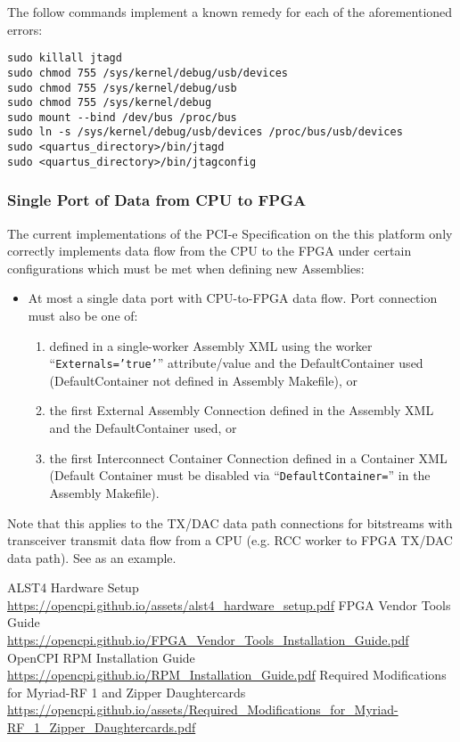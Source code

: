 \documentclass{article}
\begin{document}
\noindent The follow commands implement a known remedy for each of the aforementioned errors:
\begin{lstlisting}
sudo killall jtagd
sudo chmod 755 /sys/kernel/debug/usb/devices
sudo chmod 755 /sys/kernel/debug/usb
sudo chmod 755 /sys/kernel/debug
sudo mount --bind /dev/bus /proc/bus
sudo ln -s /sys/kernel/debug/usb/devices /proc/bus/usb/devices
sudo <quartus_directory>/bin/jtagd
sudo <quartus_directory>/bin/jtagconfig
\end{lstlisting}

\subsubsection*{Single Port of Data from CPU to FPGA} %
\label{bug:3783}
The current implementations of the PCI-e Specification on the this platform only correctly implements data flow from the CPU to the FPGA under certain configurations which must be met when defining new Assemblies:
\begin{itemize}
\item At most a single data port with CPU-to-FPGA data flow. Port connection must also be one of:
\begin{enumerate}
\item defined in a single-worker Assembly XML using the worker ``\texttt{Externals='true'}'' attribute/value and the DefaultContainer used (DefaultContainer not defined in Assembly Makefile), or
\item the first External Assembly Connection defined in the Assembly XML and the DefaultContainer used, or
\item the first Interconnect Container Connection defined in a Container XML (Default Container must be disabled via ``\texttt{DefaultContainer=}'' in the Assembly Makefile).
\end{enumerate}
\end{itemize}
Note that this applies to the TX/DAC data path connections for bitstreams with transceiver transmit data flow from a CPU (e.g. RCC worker to FPGA TX/DAC data path). See  as an example.

\pagebreak
  \begin{thebibliography}{1}


   ALST4 Hardware Setup\\
	 \url{https://opencpi.github.io/assets/alst4_hardware_setup.pdf}
   FPGA Vendor Tools Guide\\
	 \url{https://opencpi.github.io/FPGA_Vendor_Tools_Installation_Guide.pdf}
	    OpenCPI RPM Installation Guide\\
	 \url{https://opencpi.github.io/RPM_Installation_Guide.pdf}
	    Required Modifications for Myriad-RF 1 and Zipper Daughtercards\\
	 \url{https://opencpi.github.io/assets/Required_Modifications_for_Myriad-RF_1_Zipper_Daughtercards.pdf}

  \end{thebibliography}
\end{document}
